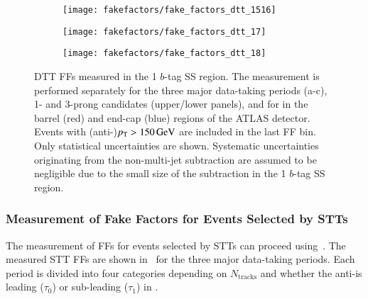 \begin{figure}[htbp]
  \centering

  \begin{subfigure}{0.495\textwidth}
    \texttt{[image: fakefactors/fake\_factors\_dtt\_1516]}
  \end{subfigure}
  \begin{subfigure}{0.495\textwidth}
    \texttt{[image: fakefactors/fake\_factors\_dtt\_17]}
  \end{subfigure}

  \begin{subfigure}{0.495\textwidth}
    \texttt{[image: fakefactors/fake\_factors\_dtt\_18]}
  \end{subfigure}

  \caption[FFs for events selected by DTTs.]{DTT FFs measured in the 1 $b$-tag
    SS region. The measurement is performed separately for the three major
    data-taking periods (a-c), 1- and 3-prong \tauhadvis candidates (upper/lower
    panels), and for \tauhadvis in the barrel (red) and end-cap (blue) regions
    of the ATLAS detector. Events with (anti-)\tauhadvis $p_{\text{T}} > \SI{150}{\ensuremath{\text{GeV}}}$
    are included in the last FF bin. Only statistical uncertainties are
    shown. Systematic uncertainties originating from the non-multi-jet
    subtraction are assumed to be negligible due to the small size of the
    subtraction in the 1 $b$-tag SS region.}%
  \label{fig:mjfakes_fake_factors}
\end{figure}


\subsubsection{Measurement of Fake Factors for Events Selected by STTs}

The measurement of FFs for events selected by STTs can proceed
using~. The measured STT FFs are shown
in~ for the three major data-taking periods. Each
period is divided into four categories depending on $N_{\text{tracks}}$ and
whether the anti-\tauhadvis is leading ($\tau_0$) or sub-leading ($\tau_1$) in
\pT.



